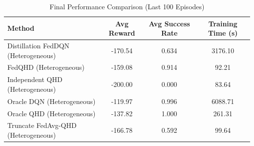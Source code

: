 \begin{table}[t]
\centering
\caption{Final Performance Comparison (Last 100 Episodes)}
\label{tab:performance_summary}
\begin{tabular}{lccc}
\toprule
Method & Avg Reward & Avg Success Rate & Training Time (s) \\
\midrule
Distillation FedDQN (Heterogeneous) & -170.54 & 0.634 & 3176.10 \\
FedQHD (Heterogeneous) & -159.08 & 0.914 & 92.21 \\
Independent QHD (Heterogeneous) & -200.00 & 0.000 & 83.64 \\
Oracle DQN (Heterogeneous) & -119.97 & 0.996 & 6088.71 \\
Oracle QHD (Heterogeneous) & -137.82 & 1.000 & 261.31 \\
Truncate FedAvg-QHD (Heterogeneous) & -166.78 & 0.592 & 99.64 \\
\bottomrule
\end{tabular}
\end{table}